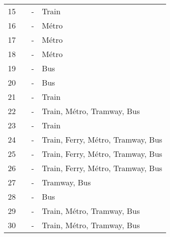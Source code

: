 \begin{longtable}{p{0.5cm}p{5.5cm}p{3cm}p{4cm}}
    \small{15} & \small{\textcite{chan_factors_2020}}\index{Chan, Kevin|pagebf} & \small{-} & \small{Train}\\
    \small{16} & \small{\textcite{chen_determinants_2012}}\index{Chen, Lijun|pagebf} & \small{-} & \small{Métro}\\
    \small{17} & \small{\textcite{chen_study_2013}}\index{Chen, Wan|pagebf} & \small{-} & \small{Métro}\\
    \small{18} & \small{\textcite{cheng_evaluating_2012}}\index{Cheng, Yung-Hsiang|pagebf} & \small{-} & \small{Métro}\\
    \small{19} & \small{\textcite{cooke_relationship_2018}}\index{Cooke, Sean|pagebf} & \small{-} & \small{Bus}\\
    \small{20} & \small{\textcite{cottrell_transforming_2007}}\index{Cottrell, Wayne D.|pagebf} & \small{-} & \small{Bus}\\
    \small{21} & \small{\textcite{coue_embarq_2021}}\index{Coué, Antoine|pagebf} & \small{-} & \small{Train}\\
    \small{22} & \small{\textcite{souza_modelling_2017}}\index{Souza, Flavia de|pagebf} & \small{-} & \small{Train, Métro, Tramway, Bus}\\
    \small{23} & \small{\textcite{debrezion_modelling_2009}}\index{Debrezion, Ghebreegziabiher|pagebf} & \small{-} & \small{Train}\\
    \small{24} & \small{\textcite{djurhuus_building_2016}}\index{Djurhuus, Sune|pagebf} & \small{-} & \small{Train, Ferry, Métro, Tramway, Bus}\\
    \small{25} & \small{\textcite{doolittle_jr_integration_1994}}\index{Doolittle Jr, John T.|pagebf} & \small{-} & \small{Train, Ferry, Métro, Tramway, Bus}\\
    \small{26} & \small{\textcite{ensor_forecasting_2010}}\index{Ensor, Matt|pagebf} & \small{-} & \small{Train, Ferry, Métro, Tramway, Bus}\\
    \small{27} & \small{\textcite{fillone_i_2018}}\index{Fillone, Alexis|pagebf} & \small{-} & \small{Tramway, Bus}\\
    \small{28} & \small{\textcite{flamm_determinants_2013}}\index{Flamm, Bradley J.|pagebf} & \small{-} & \small{Bus}\\
    \small{29} & \small{\textcite{flamm_public_2014}}\index{Flamm, Bradley J.|pagebf} & \small{-} & \small{Train, Métro, Tramway, Bus}\\
    \small{30} & \small{\textcite{flamm_changes_2014}}\index{Flamm, Bradley J.|pagebf} & \small{-} & \small{Train, Métro, Tramway, Bus}\\

\end{longtable}
